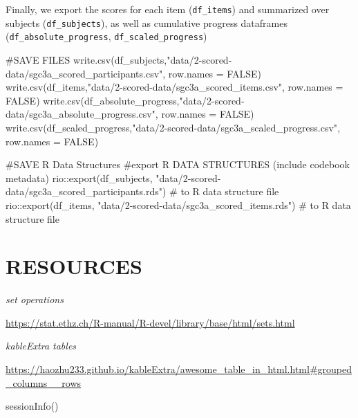 \documentclass[
  letterpaper,
  DIV=11,
  numbers=noendperiod]{scrreprt}
\newenvironment{Shaded}{\begin{snugshade}}{\end{snugshade}}
\newcommand{\AttributeTok}[1]{\textcolor[rgb]{0.40,0.45,0.13}{#1}}
\newcommand{\CommentTok}[1]{\textcolor[rgb]{0.37,0.37,0.37}{#1}}
\newcommand{\ConstantTok}[1]{\textcolor[rgb]{0.56,0.35,0.01}{#1}}
\newcommand{\FunctionTok}[1]{\textcolor[rgb]{0.28,0.35,0.67}{#1}}
\newcommand{\NormalTok}[1]{\textcolor[rgb]{0.00,0.23,0.31}{#1}}
\newcommand{\SpecialCharTok}[1]{\textcolor[rgb]{0.37,0.37,0.37}{#1}}
\newcommand{\StringTok}[1]{\textcolor[rgb]{0.13,0.47,0.30}{#1}}
\begin{document}
Finally, we export the scores for each item (\texttt{df\_items}) and
summarized over subjects (\texttt{df\_subjects}), as well as cumulative
progress dataframes (\texttt{df\_absolute\_progress},
\texttt{df\_scaled\_progress})

\begin{Shaded}
\begin{Highlighting}[]
\CommentTok{\#SAVE FILES}
\FunctionTok{write.csv}\NormalTok{(df\_subjects,}\StringTok{"data/2{-}scored{-}data/sgc3a\_scored\_participants.csv"}\NormalTok{, }\AttributeTok{row.names =} \ConstantTok{FALSE}\NormalTok{)}
\FunctionTok{write.csv}\NormalTok{(df\_items,}\StringTok{"data/2{-}scored{-}data/sgc3a\_scored\_items.csv"}\NormalTok{, }\AttributeTok{row.names =} \ConstantTok{FALSE}\NormalTok{)}
\FunctionTok{write.csv}\NormalTok{(df\_absolute\_progress,}\StringTok{"data/2{-}scored{-}data/sgc3a\_absolute\_progress.csv"}\NormalTok{, }\AttributeTok{row.names =} \ConstantTok{FALSE}\NormalTok{)}
\FunctionTok{write.csv}\NormalTok{(df\_scaled\_progress,}\StringTok{"data/2{-}scored{-}data/sgc3a\_scaled\_progress.csv"}\NormalTok{, }\AttributeTok{row.names =} \ConstantTok{FALSE}\NormalTok{)}

\CommentTok{\#SAVE R Data Structures }
\CommentTok{\#export R DATA STRUCTURES (include codebook metadata)}
\NormalTok{rio}\SpecialCharTok{::}\FunctionTok{export}\NormalTok{(df\_subjects, }\StringTok{"data/2{-}scored{-}data/sgc3a\_scored\_participants.rds"}\NormalTok{) }\CommentTok{\# to R data structure file}
\NormalTok{rio}\SpecialCharTok{::}\FunctionTok{export}\NormalTok{(df\_items, }\StringTok{"data/2{-}scored{-}data/sgc3a\_scored\_items.rds"}\NormalTok{) }\CommentTok{\# to R data structure file}
\end{Highlighting}
\end{Shaded}

\hypertarget{resources-1}{%
\section{RESOURCES}\label{resources-1}}

\emph{set operations}

\url{https://stat.ethz.ch/R-manual/R-devel/library/base/html/sets.html}

\emph{kableExtra tables}

\url{https://haozhu233.github.io/kableExtra/awesome_table_in_html.html\#grouped_columns__rows}

\begin{Shaded}
\begin{Highlighting}[]
\FunctionTok{sessionInfo}\NormalTok{()}
\end{Highlighting}
\end{Shaded}
\end{document}

